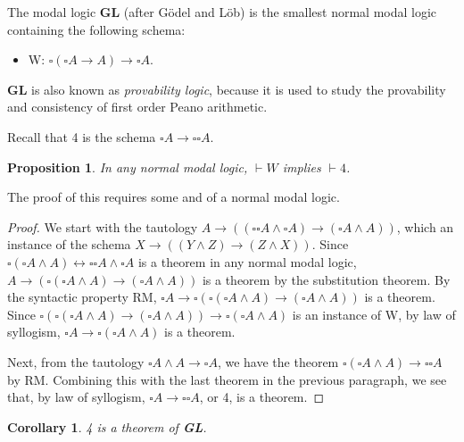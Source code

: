 \documentclass[12pt]{article}
\newtheorem{prop}{Proposition}
\newtheorem{cor}{Corollary}
\begin{document}
The modal logic \textbf{GL} (after G\"odel and L\"ob) is the smallest normal modal logic containing the following schema:
\begin{itemize}
\item W: $\square (\square A \to A ) \to \square A$.
\end{itemize}
\textbf{GL} is also known as \emph{provability logic}, because it is used to study the provability and consistency of first order Peano arithmetic.

Recall that 4 is the schema $\square A \to \square \square A$.
\begin{prop} In any normal modal logic, $\vdash W$ implies $\vdash 4$. \end{prop}
The proof of this requires some  and  of a normal modal logic.
\begin{proof}  We start with the tautology $A \to ((\square \square A \land \square A) \to (\square A \land A))$, which an instance of the schema $X \to ((Y\land Z)\to (Z \land X))$.  Since $\square (\square A \land A) \leftrightarrow \square \square A \land \square A$ is a theorem in any normal modal logic, $A \to (\square (\square A \land A) \to (\square A\land A))$ is a theorem by the substitution theorem.  By the syntactic property RM, $\square A \to \square (\square (\square A \land A) \to (\square A\land A))$ is a theorem.  Since $\square (\square (\square A \land A) \to (\square A\land A)) \to \square (\square A \land A)$ is an instance of W, by law of syllogism, $\square A \to \square (\square A \land A)$ is a theorem.

Next, from the tautology $\square A \land A \to \square A$, we have the theorem $\square (\square A\land A) \to \square \square A$ by RM.  Combining this with the last theorem in the previous paragraph, we see that, by law of syllogism, $\square A \to \square \square A$, or 4, is a theorem.
\end{proof}

\begin{cor} 4 is a theorem of \textbf{GL}. \end{cor}
\end{document}
